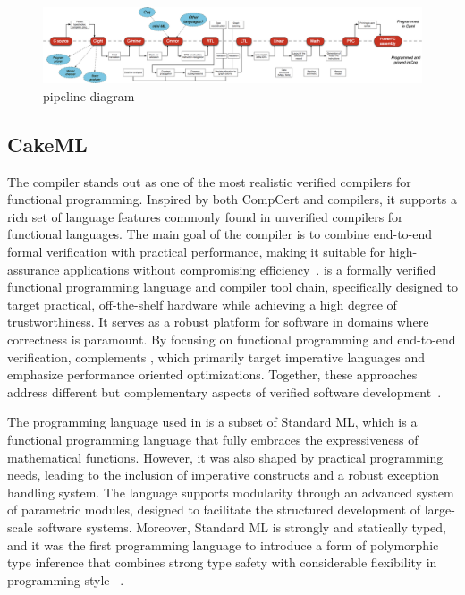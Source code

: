 \begin{figure}[H]
    \centering
    \includegraphics[width=\linewidth]{images/compcert_diagram.png}
    \caption{\compcert pipeline diagram~\cite{hal-01643290, CompCertPipeline}}
    \label{fig:CompCertPipeline}
\end{figure}

\subsection{CakeML}
\label{sec:CakeML}

The \cml compiler stands out as one of the most realistic verified compilers for functional programming. Inspired by both CompCert 
and \ocaml compilers, it supports a rich set of language features commonly found in unverified compilers for functional languages. The 
main goal of the \cml compiler is to combine end-to-end formal verification with practical performance, making it suitable 
for high-assurance applications without compromising efficiency~\cite{TanMKFON19}. \cml is a formally verified functional programming 
language and compiler tool chain, specifically designed to target practical, off-the-shelf hardware while achieving a high degree of 
trustworthiness. It serves as a robust platform for software in domains where correctness is paramount. By focusing on functional 
programming and end-to-end verification, \cml complements \compcert, which primarily target imperative languages and emphasize 
performance oriented optimizations. Together, these approaches address different but complementary aspects of verified software 
development~\cite{POPL14}.

The programming language used in \cml is a subset of Standard ML, which is
a functional programming language that fully embraces the expressiveness of mathematical functions. 
However, it was also shaped by practical programming needs, leading to the inclusion of imperative constructs and a 
robust exception handling system. The language supports modularity through an advanced system of parametric modules, 
designed to facilitate the structured development of large-scale software systems. Moreover, Standard ML is strongly 
and statically typed, and it was the first programming language to introduce a form of polymorphic type inference that 
combines strong type safety with considerable flexibility in programming style ~\cite{milner1997definition}.

